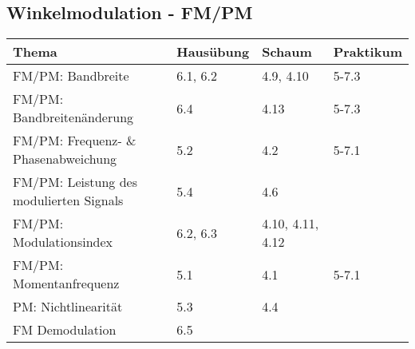 \subsection{Winkelmodulation - FM/PM}
	\begin{tabular}{|p{9cm}|p{2.5cm}|p{3.5cm}|p{2cm}|}
	\hline
	\textbf{Thema} & \textbf{Hausübung} & \textbf{Schaum} & \textbf{Praktikum} \\ \hline
	FM/PM: Bandbreite & 6.1, 6.2 & 4.9, 4.10 & 5-7.3 \\ \hline
	FM/PM: Bandbreitenänderung & 6.4 & 4.13 & 5-7.3 \\ \hline
	FM/PM: Frequenz- \& Phasenabweichung & 5.2 & 4.2 & 5-7.1 \\ \hline
	FM/PM: Leistung des modulierten Signals & 5.4 & 4.6 &  \\ \hline
	FM/PM: Modulationsindex & 6.2, 6.3 & 4.10, 4.11, 4.12 &  \\ \hline
	FM/PM: Momentanfrequenz & 5.1 & 4.1 & 5-7.1 \\ \hline
	PM: Nichtlinearität & 5.3 & 4.4 &  \\ \hline
	FM Demodulation & 6.5 & & \\
	\hline
	\end{tabular}

